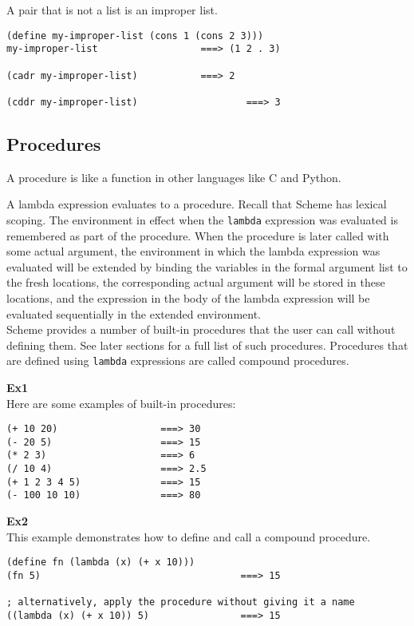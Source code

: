 \documentclass{article}
\begin{document}
A pair that is not a list is an improper list.

\begin{lstlisting}
(define my-improper-list (cons 1 (cons 2 3)))
my-improper-list                  ===> (1 2 . 3)

(cadr my-improper-list)           ===> 2

(cddr my-improper-list)                   ===> 3
\end{lstlisting}

\subsection*{Procedures}
A procedure is like a function in other languages like C and Python.

A lambda expression evaluates to a procedure. Recall that Scheme has lexical scoping. The environment in effect when the \texttt{lambda} expression was evaluated is remembered as part of the procedure. When the procedure is later called with some actual argument, the environment in  which the lambda expression was evaluated will be extended by binding the variables in the formal argument list to the fresh locations, the corresponding actual argument will be stored in these locations, and the expression in the body of the lambda expression will be evaluated sequentially in the extended environment.\\

Scheme provides a number of built-in procedures that the user can call without defining them. See later sections for a full list of such procedures. Procedures that are defined using \texttt{lambda} expressions are called compound procedures.

\textbf{Ex1}\\
Here are some examples of built-in procedures:
\begin{lstlisting}
(+ 10 20)                  ===> 30
(- 20 5)                   ===> 15
(* 2 3)                    ===> 6
(/ 10 4)                   ===> 2.5
(+ 1 2 3 4 5)              ===> 15
(- 100 10 10)              ===> 80
\end{lstlisting}

\textbf{Ex2}\\
This example demonstrates how to define and call a compound procedure.
\begin{lstlisting}
(define fn (lambda (x) (+ x 10)))
(fn 5)                                   ===> 15

; alternatively, apply the procedure without giving it a name
((lambda (x) (+ x 10)) 5)                ===> 15
\end{lstlisting}
\end{document}
